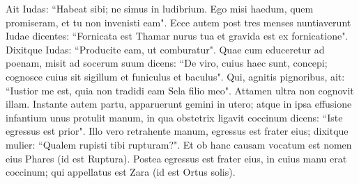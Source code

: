 \begin{biblechapter}
\verse Ait Iudas: “Habeat sibi; ne simus in ludibrium. Ego misi haedum, quem promiseram, et tu non invenisti eam". 
\verse Ecce autem post tres menses nuntiaverunt Iudae dicentes: “Fornicata est Thamar nurus tua et gravida est ex fornicatione". Dixitque Iudas: “Producite eam, ut comburatur". 
\verse Quae cum educeretur ad poenam, misit ad socerum suum dicens: “De viro, cuius haec sunt, concepi; cognosce cuius sit sigillum et funiculus et baculus". 
\verse Qui, agnitis pignoribus, ait: “Iustior me est, quia non tradidi eam Sela filio meo". Attamen ultra non cognovit illam. 
\verse Instante autem partu, apparuerunt gemini in utero; atque in ipsa effusione infantium unus protulit manum, in qua obstetrix ligavit coccinum dicens: 
\verse “Iste egressus est prior". 
\verse Illo vero retrahente manum, egressus est frater eius; dixitque mulier: “Qualem rupisti tibi rupturam?". Et ob hanc causam vocatum est nomen eius Phares (id est Ruptura). 
\verse Postea egressus est frater eius, in cuius manu erat coccinum; qui appellatus est Zara (id est Ortus solis). 
\end{biblechapter}

